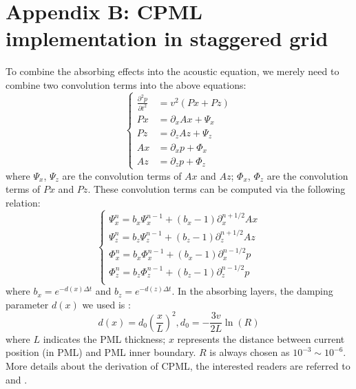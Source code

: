 \appendix
\section{Appendix B: CPML implementation in staggered grid}
To combine the absorbing effects into the acoustic equation, we merely need to combine two convolution terms into the above equations:
\begin{equation}
\left\{
\begin{split}
\frac{\partial^2 p}{\partial t^2}&=v^2\left(Px+Pz\right)\\
Px&=\partial_x Ax+\Psi_x\\
Pz&=\partial_z Az+\Psi_z\\
Ax&=\partial_x p+\Phi_x\\
Az&=\partial_z p+\Phi_z
\end{split}
\right.
\end{equation}
where $\Psi_x$, $\Psi_z$ are the convolution terms of $Ax$ and $Az$; $\Phi_x$, $\Phi_z$ are the convolution terms of $Px$ and $Pz$. These convolution terms can be computed via the following relation:
\begin{equation}
\left\{
\begin{split}
\Psi_x^n=b_x \Psi_x^{n-1}+(b_x-1) \partial_x^{n+1/2}Ax\\
\Psi_z^n=b_z \Psi_z^{n-1}+(b_z-1) \partial_z^{n+1/2}Az\\
\Phi_x^n=b_x \Phi_x^{n-1}+(b_x-1) \partial_x^{n-1/2}p\\
\Phi_z^n=b_z \Phi_z^{n-1}+(b_z-1) \partial_z^{n-1/2}p\\
\end{split}
\right.
\end{equation}
where $b_x=e^{-d(x)\Delta t}$ and $b_z=e^{-d(z)\Delta t}$. In the absorbing layers, the damping parameter $d(x)$ we used is \citep{collino2001application}:
\begin{equation}
 d(x)=d_0(\frac{x}{L})^2, d_0=-\frac{3v}{2L}\ln(R)
\end{equation}
where $ L$ indicates the PML thickness; $x$ represents the distance between current position (in PML) and PML inner boundary. $R$ is always chosen as $10^{-3}\sim 10^{-6}$. More details about the derivation of CPML, the interested readers are referred to \cite{collino2001application} and \cite{komatitsch2007unsplit}.







